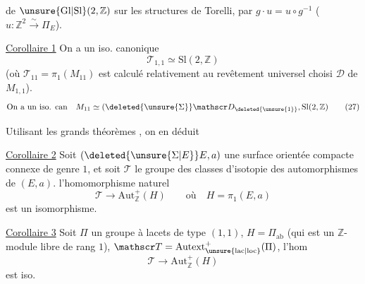 de $\unsure{\mathrm{Gl}|\mathrm{Sl}}(2,\mathbb Z)$ sur les structures de Torelli, par $g\cdot u=u\circ g^{-1}$ ($u\colon\mathbb Z^2\xrightarrow{\sim}\Pi_E$).

\uline{Corollaire 1} On a un iso. canonique
\[
 \mathscr T_{1,1}\simeq\mathrm{Sl}(2,\mathbb Z) \tag*{(26)}
\]
(où $\mathscr T_{11}=\pi_1(M_{11})$ est calculé relativement au revêtement universel choisi $\mathscr D$ de $M_{1,1}$).
\[
 \text{On a un iso. can}\quad M_{11}\simeq(\deleted{\unsure{\Sigma}}\mathscr D_{\deleted{\unsure{1}}},\mathrm{Sl}(2,\mathbb Z) \tag*{(27)}
\]

Utilisant les grands théorèmes , on en déduit

\uline{Corollaire 2} Soit $(\deleted{\unsure{\Sigma|E}}E,a)$ une surface  orientée compacte connexe de genre $1$, et soit $\mathscr T$ le groupe des classes d'isotopie des automorphismes de $(E,a)$.   l'homomorphisme naturel
\[
 \mathscr T\longrightarrow\mathrm{Aut}_{\mathbb Z}^{+}(H)\qquad\text{où}\quad H=\pi_1(E,a) \tag*{(27)}
\]
est un isomorphisme. 

\uline{Corollaire 3} Soit $\Pi$ un groupe à lacets de type  $(1,1)$, $H=\Pi_{\mathrm{ab}}$ (qui est un $\mathbb Z$-module libre de rang $1$), $\mathscr T=\mathrm{Autext}_{\unsure{\mathrm{lac}|\mathrm{loc}}}^+(\Pi)$,  l'hom
\[
 \mathscr T\longrightarrow\mathrm{Aut}_{\mathbb Z}^+(H) \tag*{(28)}
\]
est iso.
